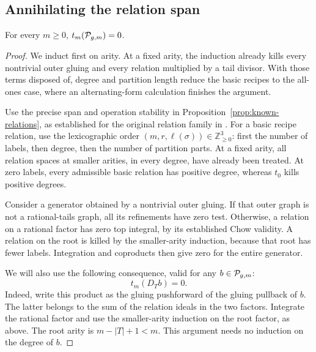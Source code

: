 \subsection{Annihilating the relation span}

\begin{lemma}
\label{lem:detector-annihilation}
For every \(m\geq0\), \(t_m(\mathcal P_{g,m})=0\).
\end{lemma}

\begin{proof}
We induct first on arity.  At a fixed arity, the induction already
kills every nontrivial outer gluing and every relation multiplied
by a tail divisor.  With those terms disposed of, degree and
partition length reduce the basic recipes to the all-ones case,
where an alternating-form calculation finishes the argument.

Use the precise span and operation stability in
Proposition~\ref{prop:known-relations}, as established for the
original relation family in \cite[Proposition~1]{Pixton}.
For a basic recipe relation, use the lexicographic order
\((m,r,\ell(\sigma))\in\mathbb Z_{\geq0}^3\):
first the number of labels, then degree, then the number
of partition parts.  At a fixed arity, all relation spaces
at smaller arities, in every degree, have already been
treated.  At zero labels, every admissible basic relation
has positive degree, whereas \(t_0\) kills positive degrees.

Consider a generator obtained by a nontrivial outer gluing.
If that outer graph is not a rational-tails graph, all its
refinements have zero test.  Otherwise, a relation on a
rational factor has zero top integral, by its established
Chow validity.  A relation on the root is killed by the
smaller-arity induction, because that root has fewer labels.
Integration and coproducts then give zero for the entire
generator.

We will also use the following consequence, valid for any
\(b\in\mathcal P_{g,m}\):
\begin{equation}
 t_m(D_Tb)=0.
 \label{eq:detector-tail-ideal}
\end{equation}
Indeed, write this product as the gluing pushforward of the
gluing pullback of \(b\).  The latter belongs to the sum of
the relation ideals in the two factors.  Integrate the
rational factor and use the smaller-arity induction on the
root factor, as above.  The root arity is
\(m-|T|+1<m\).  This argument needs no induction on the
degree of \(b\).


\end{proof}
